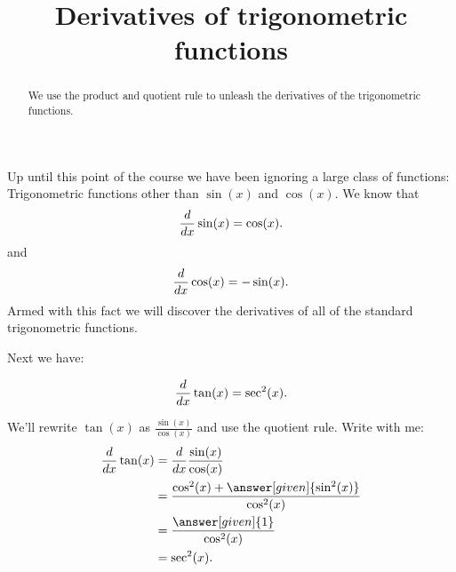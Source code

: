 \documentclass{ximera}
\title[Dig-In:]{Derivatives of trigonometric functions}
\begin{document}
\begin{abstract}
  We use the product and quotient rule to unleash the derivatives of the
  trigonometric functions.
\end{abstract}
\maketitle


Up until this point of the course we have been ignoring a large class
of functions: Trigonometric functions other than $\sin(x)$ and $\cos(x)$. We know
that
\[
\frac{d}{\mathop{}\!d x} \sin(x) = \cos(x).
\]
and 
\[
\frac{d}{\mathop{}\!d x} \cos(x) = -\sin(x).
\]
Armed with this fact we will discover the derivatives of all of the
standard trigonometric functions.





Next we have:

\begin{theorem}
\[
\frac{d}{\mathop{}\!d x} \tan(x) = \sec^2(x).
\]

\begin{explanation}
We'll rewrite $\tan(x)$ as $\frac{\sin(x)}{\cos(x)}$ and use the
quotient rule. Write with me:
\begin{align*}
\ddx\tan(x) &= \ddx\frac{\sin(x)}{\cos(x)}\\
&=\frac{\cos^2(x) + \answer[given]{\sin^2(x)}}{\cos^2(x)}\\
&=\frac{\answer[given]{1}}{\cos^2(x)}\\
&=\sec^2(x).
\end{align*}
\end{explanation}
\end{theorem}
\end{document}

